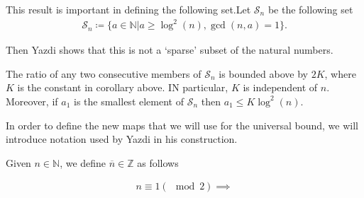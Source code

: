 This result is important in defining the following set.Let $\mathcal{S}_n$ be the following set
\begin{align*}
    \mathcal{S}_n \coloneqq \{a \in \mathbb{N} \vert a \geq \log^2(n), \gcd(n,a) = 1\}.
\end{align*}

Then Yazdi shows that this is not a `sparse' subset of the natural numbers.

\begin{lem}[Yazdi]
The ratio of any two consecutive members of $\mathcal{S}_n$ is bounded above by $2K$, where $K$ is the constant in corollary above. IN particular, $K$ is independent of $n$. Moreover, if $a_1$ is the smallest element of $\mathcal{S}_n$ then $a_1 \leq K\log^2(n)$.
\end{lem}

In order to define the new maps that we will use for the universal bound, we will introduce notation used by Yazdi in his construction.

Given $n \in \mathbb{N}$, we define $\overline{n} \in \mathbb{Z}$ as follows

\begin{gather*}
    n \equiv 1 (\mod 2) \implies
\end{gather*}
